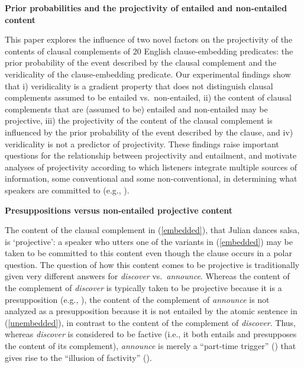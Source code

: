 \documentclass[12pt,fleqn]{article}
\newcommand{\6}{\mbox{$[\hspace*{-.6mm}[$}}
\newcommand{\9}{\mbox{$]\hspace*{-.6mm}]$}}
\begin{document}
 
 
\begin{center}
{\large \bf Prior probabilities and the projectivity of entailed and non-entailed content}
\end{center}

This paper explores the influence of two novel factors on the projectivity of the contents of clausal complements of 20 English clause-embedding predicates: the prior probability of the event described by the clausal complement and the veridicality of the clause-embedding predicate. Our experimental findings show that i) veridicality is a gradient property that does not distinguish clausal complements assumed to be entailed vs.\ non-entailed, ii) the content of clausal complements that are (assumed to be) entailed and non-entailed may be projective, iii) the projectivity of the content of the clausal complement is influenced by the prior probability of the event described by the clause, and iv) veridicality is not a predictor of projectivity. These findings raise important questions for the relationship between projectivity and entailment, and motivate analyses of projectivity according to which listeners integrate multiple sources of information, some conventional and some non-conventional, in determining what speakers are committed to (e.g., \citealt{brst-salt10,brst-ar,abrusan2011,abrusan2016,tbd-variability}). 

{\bf Presuppositions versus non-entailed projective content} 

The content of the clausal complement in (\ref{embedded}), that Julian dances salsa, is `projective': a speaker who utters one of the variants in (\ref{embedded}) may be taken to be committed to this content even though the clause occurs in a polar question. The question of how this content comes to be projective is traditionally given very different answers for {\em discover} vs.\ {\em announce}. Whereas the content of the complement of {\em discover} is typically taken to be projective because it is a presupposition (e.g., \citealt{heim83,vds92}), the content of the complement of {\em announce} is not analyzed as a presupposition because it is not entailed by the atomic sentence in (\ref{unembedded}), in contrast to the content of the complement of {\em discover}. Thus, whereas {\em discover} is considered to be factive (i.e., it both entails and presupposes the content of its complement), {\em announce} is merely a ``part-time trigger'' (\citealt[139]{schlenker10}) that gives rise to the ``illusion of factivity'' (\citealt[76]{anand-hacquard2014}). 
\end{document}
